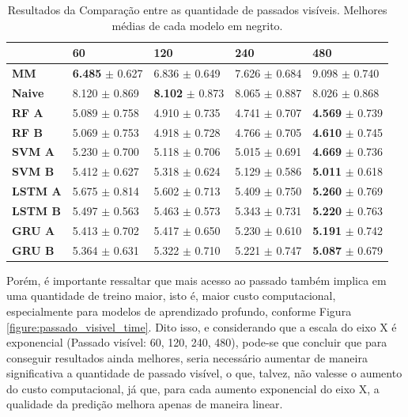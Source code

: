 \begin{table}[htbp]
    \begin{tabular*}{\linewidth}{@{\extracolsep{\fill}}lllll}
    \toprule
     & 
    \multicolumn{1}{l}{\textbf{60}} & 
    \multicolumn{1}{l}{\textbf{120}} &
    \multicolumn{1}{l}{\textbf{240}} &
    \multicolumn{1}{l}{\textbf{480}} \\
    \midrule
    \textbf{MM} & \textbf{6.485} $\pm$ 0.627 & 6.836 $\pm$ 0.649 & 7.626 $\pm$ 0.684 & 9.098 $\pm$ 0.740
    \\
    \midrule
    \textbf{Naive} & 8.120 $\pm$ 0.869 & \textbf{8.102} $\pm$ 0.873 & 8.065 $\pm$ 0.887 & 8.026 $\pm$ 0.868 
    \\
    \midrule
    \textbf{RF A} & 5.089 $\pm$ 0.758 & 4.910 $\pm$ 0.735 & 4.741 $\pm$ 0.707 & \textbf{4.569} $\pm$ 0.739 
    \\
    \midrule
    \textbf{RF B} & 5.069 $\pm$ 0.753 & 4.918 $\pm$ 0.728 & 4.766 $\pm$ 0.705 & \textbf{4.610} $\pm$ 0.745 
    \\
    \midrule
    \textbf{SVM A} & 5.230 $\pm$ 0.700 & 5.118 $\pm$ 0.706 & 5.015 $\pm$ 0.691 & \textbf{4.669} $\pm$ 0.736 
    \\
    \midrule
    \textbf{SVM B} & 5.412 $\pm$ 0.627 & 5.318 $\pm$ 0.624 & 5.129 $\pm$ 0.586 & \textbf{5.011} $\pm$ 0.618 
    \\
    \midrule
    \textbf{LSTM A} & 5.675 $\pm$ 0.814 & 5.602 $\pm$ 0.713 & 5.409 $\pm$ 0.750 & \textbf{5.260} $\pm$ 0.769 
    \\
    \midrule
    \textbf{LSTM B} & 5.497 $\pm$ 0.563 & 5.463 $\pm$ 0.573 & 5.343 $\pm$ 0.731 & \textbf{5.220} $\pm$ 0.763 
    \\
    \midrule
    \textbf{GRU A} & 5.413 $\pm$ 0.702 & 5.417 $\pm$ 0.650 & 5.230 $\pm$ 0.610 & \textbf{5.191} $\pm$ 0.742 
    \\
    \midrule
    \textbf{GRU B} & 5.364 $\pm$ 0.631 & 5.322 $\pm$ 0.710 & 5.221 $\pm$ 0.747 & \textbf{5.087} $\pm$ 0.679
    \\
    \bottomrule
    \end{tabular*}
    \label{table:res_past}
    \caption{Resultados da Comparação entre as quantidade de passados visíveis. Melhores médias de cada modelo em negrito.}
\end{table}
 

Porém, é importante ressaltar que mais acesso ao passado também implica em uma quantidade de treino maior, isto é, maior custo computacional, especialmente para modelos de aprendizado profundo, conforme Figura \ref{figure:passado_visivel_time}. Dito isso, e considerando que a escala do eixo X é exponencial (Passado visível: 60, 120, 240, 480), pode-se que concluir que para conseguir resultados ainda melhores, seria necessário aumentar de maneira significativa a quantidade de passado visível, o que, talvez, não valesse o aumento do custo computacional, já que, para cada aumento exponencial do eixo X, a qualidade da predição melhora apenas de maneira linear. 

